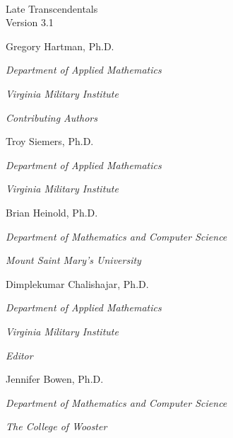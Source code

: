 


\begin{flushright}

\textsc{\large \apex\ {\Huge\thetitle}} \\

Late Transcendentals \\

{\small Version 3.1}\\


\Large

Gregory Hartman, Ph.D.

\emph{\small Department of Applied Mathematics}

\emph{\small Virginia Military Institute}\bigskip

\textit{Contributing Authors}\hfill~

Troy Siemers, Ph.D.

\emph{\small Department of Applied Mathematics}

\emph{\small Virginia Military Institute}\bigskip

Brian Heinold, Ph.D.

\emph{\small Department of Mathematics and Computer Science}

\emph{\small Mount Saint Mary's University}\bigskip

Dimplekumar Chalishajar, Ph.D.

\emph{\small Department of Applied Mathematics}

\emph{\small Virginia Military Institute}\bigskip\medskip

\textit{Editor}\hfill~

Jennifer Bowen, Ph.D.

\emph{\small Department of Mathematics and Computer Science}

\emph{\small The College of Wooster}

\end{flushright}
\normalsize
{}
\restoregeometry
